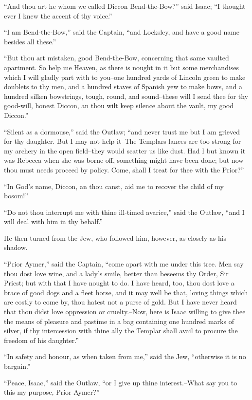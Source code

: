 ``And thou art he whom we called Diccon Bend-the-Bow?'' said Isaac; ``I
thought ever I knew the accent of thy voice.''

``I am Bend-the-Bow,'' said the Captain, ``and Locksley, and have a good
name besides all these.''

``But thou art mistaken, good Bend-the-Bow, concerning that same vaulted
apartment. So help me Heaven, as there is nought in it but some
merchandises which I will gladly part with to you--one hundred yards of
Lincoln green to make doublets to thy men, and a hundred staves of
Spanish yew to make bows, and a hundred silken bowstrings, tough, round,
and sound--these will I send thee for thy good-will, honest Diccon, an
thou wilt keep silence about the vault, my good Diccon.''

``Silent as a dormouse,'' said the Outlaw; ``and never trust me but I am
grieved for thy daughter. But I may not help it--The Templars lances are
too strong for my archery in the open field--they would scatter us like
dust. Had I but known it was Rebecca when she was borne off, something
might have been done; but now thou must needs proceed by policy. Come,
shall I treat for thee with the Prior?''

``In God's name, Diccon, an thou canst, aid me to recover the child of
my bosom!''

``Do not thou interrupt me with thine ill-timed avarice,'' said the
Outlaw, ``and I will deal with him in thy behalf.''

He then turned from the Jew, who followed him, however, as closely as
his shadow.

``Prior Aymer,'' said the Captain, ``come apart with me under this tree.
Men say thou dost love wine, and a lady's smile, better than beseems thy
Order, Sir Priest; but with that I have nought to do. I have heard, too,
thou dost love a brace of good dogs and a fleet horse, and it may well
be that, loving things which are costly to come by, thou hatest not a
purse of gold. But I have never heard that thou didst love oppression or
cruelty.--Now, here is Isaac willing to give thee the means of pleasure
and pastime in a bag containing one hundred marks of silver, if thy
intercession with thine ally the Templar shall avail to procure the
freedom of his daughter.''

``In safety and honour, as when taken from me,'' said the Jew,
``otherwise it is no bargain.''

``Peace, Isaac,'' said the Outlaw, ``or I give up thine interest.--What
say you to this my purpose, Prior Aymer?''


